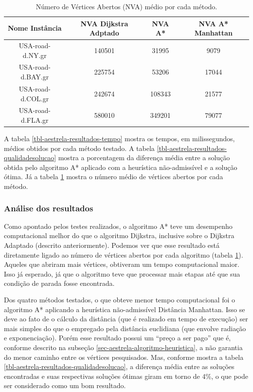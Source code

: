 \begin{table}[H]
\caption{Número de Vértices Abertos (NVA) médio por cada método.}
\label{tbl-aestrela-resultados-nva}
\centering
\begin{adjustbox}{max width=\textwidth}
\begin{tabular}{|c|c|c|c|}
\hline
\textbf{Nome Instância} & \textbf{NVA Dijkstra Adptado} & \textbf{NVA A*} & \textbf{NVA A* Manhattan} \\ \hline
USA-road-d.NY.gr        & 140501                        & 31995           & 9079                      \\ \hline
USA-road-d.BAY.gr       & 225754                        & 53206           & 17044                     \\ \hline
USA-road-d.COL.gr       & 242674                        & 108343          & 21577                     \\ \hline
USA-road-d.FLA.gr       & 580010                        & 349201          & 79077                     \\ \hline
\end{tabular} 
\end{adjustbox}
\end{table}

A tabela \ref{tbl-aestrela-resultados-tempo} mostra os tempos, em milissegundos, médios obtidos por cada método testado. A tabela \ref{tbl-aestrela-resultados-qualidadesolucao} mostra a porcentagem da diferença média entre a solução obtida pelo algoritmo A* aplicado com a heurística não-admissível e a solução ótima. Já a tabela \ref{tbl-aestrela-resultados-nva} mostra o número médio de vértices abertos por cada método.
\subsubsection{Análise dos resultados}
\label{sec-aestrela-resultados-analise}
Como apontado pelos testes realizados, o algoritmo A* teve um desempenho computacional melhor do que o algoritmo Dijkstra, inclusive sobre o Dijkstra Adaptado (descrito anteriormente). Podemos ver que esse resultado está diretamente ligado ao número de vértices abertos por cada algoritmo (tabela \ref{tbl-aestrela-resultados-nva}). Aqueles que abriram mais vértices, obtiveram um tempo computacional maior. Isso já esperado, já que o algoritmo teve que processar mais etapas até que sua condição de parada fosse encontrada.

Dos quatro métodos testados, o que obteve menor tempo computacional foi o algoritmo A* aplicando a heurística não-admissível Distância Manhattan. Isso se deve ao fato de o cálculo da distância (que é realizado em tempo de execução) ser mais simples do que o empregado pela distância euclidiana (que envolve radiação e exponenciação). Porém esse resultado possui um ``preço a ser pago'' que é, conforme descrito na subseção \ref{sec-aestrela-algoritmo-heuristica}, a não garantia do menor caminho entre os vértices pesquisados. Mas, conforme mostra a tabela \ref{tbl-aestrela-resultados-qualidadesolucao}, a diferença média entre as soluções encontradas e suas respectivas soluções ótimas giram em torno de 4\%, o que pode ser considerado como um bom resultado.

